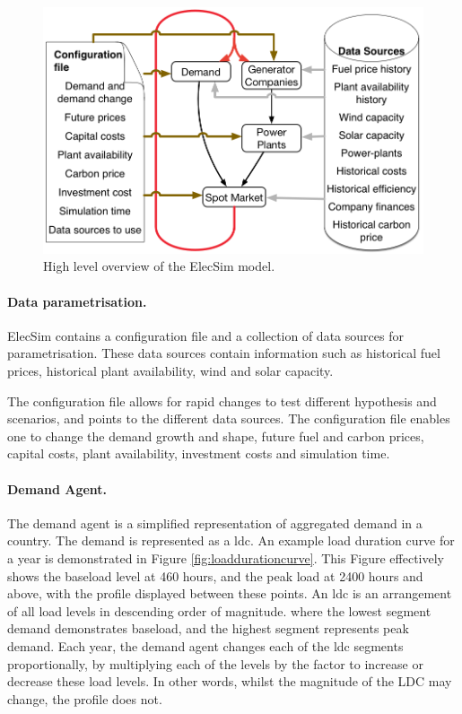 \begin{figure}
	\centering
	\includegraphics[width=0.85\linewidth]{Chapter4/figures/System_overview_large.png}
	\caption{High level overview of the ElecSim model.}
	\label{fig:systemoverview}
\end{figure}

\paragraph{Data parametrisation.} ElecSim contains a configuration file and a collection of data sources for parametrisation. These data sources contain information such as historical fuel prices, historical plant availability, wind and solar capacity.

The configuration file allows for rapid changes to test different hypothesis and scenarios, and points to the different data sources. The configuration file enables one to change the demand growth and shape, future fuel and carbon prices, capital costs, plant availability, investment costs and simulation time.

\paragraph{Demand Agent.} The demand agent is a simplified representation of aggregated demand in a country. The demand is represented as a \gls{ldc}. An example load duration curve for a year is demonstrated in Figure \ref{fig:loaddurationcurve}. This Figure effectively shows the baseload level at 460 hours, and the peak load at 2400 hours and above, with the profile displayed between these points. An \acrshort{ldc} is an arrangement of all load levels in descending order of magnitude. where the lowest segment demand demonstrates baseload, and the highest segment represents peak demand. Each year, the demand agent changes each of the \acrshort{ldc} segments proportionally, by multiplying each of the levels by the factor to increase or decrease these load levels. In other words, whilst the magnitude of the LDC may change, the profile does not.

